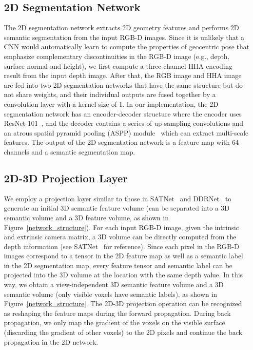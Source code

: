 \documentclass[letterpaper]{article} \usepackage{aaai20}  \usepackage{times}  \usepackage{helvet} \usepackage{courier}  \usepackage[hyphens]{url}  \usepackage{graphicx} \urlstyle{rm} \def\UrlFont{\rm}  \usepackage{graphicx}  \frenchspacing  \setlength{\pdfpagewidth}{8.5in}  \setlength{\pdfpageheight}{11in}
\begin{document}
\subsection{2D Segmentation Network}
\label{2D Network}
The 2D segmentation network extracts 2D geometry features and performs 2D semantic segmentation from the input RGB-D images. Since it is unlikely that a CNN would automatically learn to compute the properties of geocentric pose that emphasize complementary discontinuities in the RGB-D image (e.g., depth, surface normal and height), we first compute a three-channel HHA \cite{Gupta2014LearningRF} encoding result from the input depth image. After that, the RGB image and HHA image are fed into two 2D segmentation networks that have the same structure but do not share weights, and their individual outputs are fused together by a convolution layer with a kernel size of 1. In our implementation, the 2D segmentation network has an encoder-decoder structure where the encoder uses ResNet-101~\cite{He2015DeepRL}, and the decoder contains a series of up-sampling convolutions and an atrous spatial pyramid pooling (ASPP) module~\cite{Chen2016DeepLabSI,Chen2018EncoderDecoderWA} which can extract multi-scale features. The output of the 2D segmentation network is a feature map with 64 channels and a semantic segmentation map.


\subsection{2D-3D {Projection} Layer}
\label{projection layer}
We employ a projection layer similar to those in SATNet~\cite{Liu2018SeeAT} and DDRNet~\cite{Li2019RGBDBD} to generate an initial 3D semantic feature volume (can be separated into a 3D semantic volume and a 3D feature volume, as shown in Figure~\ref{network_structure}). For each input RGB-D image, given the intrinsic and extrinsic camera matrix, a 3D volume can be directly computed from the depth information (see SATNet~\cite{Liu2018SeeAT} for reference). Since each pixel in the RGB-D images correspond to a tensor in the 2D feature map as well as a semantic label in the 2D segmentation map, every feature tensor and semantic label can be projected into the 3D volume at the location with the same depth value. In this way, we obtain a view-independent 3D semantic feature volume and a 3D semantic volume (only visible voxels have semantic labels), as shown in Figure~\ref{network_structure}. The 2D-3D projection operation can be recognized as reshaping the feature maps during the forward propagation. During back propagation, we only map the gradient of the voxels on the visible surface (discarding the gradient of other voxels) to the 2D pixels and continue the back propagation in the 2D network.
\end{document}

